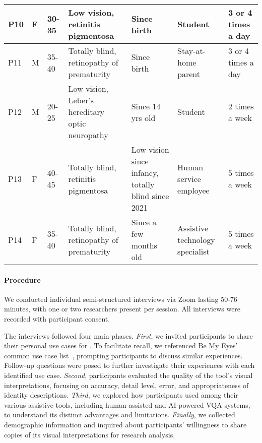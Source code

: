 \begin{table*}[]
\begin{tabular}{p{0.3cm}p{0.8cm}p{0.8cm}p{4.8cm}p{2.8cm}p{3cm}p{2.1cm}}
P10 & F & 30-35 & Low vision, retinitis pigmentosa & Since birth & Student &  3 or 4 times a day \\ \hline
P11 & M & 35-40 & Totally blind, retinopathy of prematurity & Since birth & Stay-at-home parent &  3 or 4 times a day \\ \hline
P12 & M & 20-25 & Low vision, Leber's hereditary optic neuropathy & Since 14 yrs old & Student &  2 times a week \\ \hline
P13 & F & 40-45 & Totally blind, retinitis pigmentosa & Low vision since infancy, totally blind since 2021 & Human service employee &  5 times a week \\ \hline
P14 & F & 35-40 & Totally blind, retinopathy of prematurity & Since a few months old & Assistive technology specialist &  5 times a week 
\\ \bottomrule
\end{tabular}
\end{table*}




\paragraph{Procedure} We conducted individual semi-structured interviews via Zoom lasting 50-76 minutes, with one or two researchers present per session. All interviews were recorded with participant consent. 

The interviews followed four main phases. 
% 
\textit{First}, we invited participants to share their personal use cases for \bma. 
To facilitate recall, we referenced Be My Eyes' common use case list~\cite{bma_usecase}, prompting participants to discuss similar experiences. 
% 
Follow-up questions were posed to further investigate their experiences with each identified use case. 
% 
\textit{Second}, participants evaluated the quality of the tool's visual interpretations, focusing on accuracy, detail level, error, and appropriateness of identity descriptions. 
% 
\textit{Third}, we explored how participants used \sbma{} among their various assistive tools, including human-assisted and AI-powered VQA systems, to understand its distinct advantages and limitations. 
% 
\textit{Finally}, we collected demographic information and inquired about participants' willingness to share copies of its visual interpretations for research analysis.








